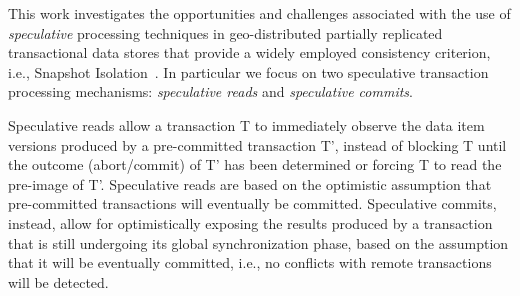 This work investigates the opportunities and challenges associated with the use of \textit{speculative} processing techniques in geo-distributed partially replicated transactional data stores  that provide a widely employed consistency criterion, i.e., Snapshot Isolation~\cite{xxx}.
In particular we focus on two speculative transaction processing mechanisms: \textit{speculative reads} and \textit{speculative commits}.




Speculative reads  allow a transaction T to immediately observe the  data item versions produced by a pre-committed transaction T', instead of blocking T until the outcome (abort/commit) of T' has been determined or forcing T to read the pre-image of T'. Speculative reads are based on the optimistic assumption that pre-committed transactions will eventually be committed. %
%
%
 Speculative commits, instead, allow for optimistically exposing the results produced by a transaction that is still undergoing its global synchronization phase, based on the assumption that it will be eventually committed, i.e., no conflicts with remote transactions will be detected.

